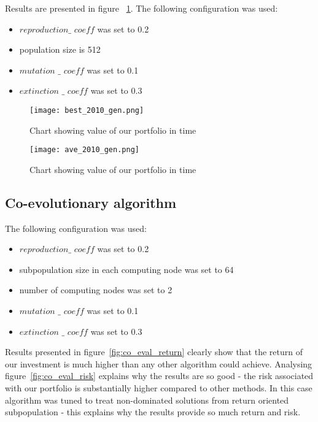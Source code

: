 Results are presented in figure ~\ref{fig:gen-algo}.
The following configuration was used:
\begin{itemize}
  \item $reproduction\_$ $coeff$ was set to 0.2
  \item population size is 512
  \item $mutation$ $\_$ $coeff$ was set to 0.1
  \item $extinction$ $\_$ $coeff$ was set to 0.3
\end{itemize}


\begin{figure}[ht]
  \begin{center}
    \texttt{[image: best\_2010\_gen.png]}
  \end{center}
  \caption{Chart showing value of our portfolio in time}
  \label{fig:gen-algo}
\end{figure}

\begin{figure}[ht]
  \begin{center}
    \texttt{[image: ave\_2010\_gen.png]}
  \end{center}
  \caption{Chart showing value of our portfolio in time}
  \label{fig:gen-algo-ave-2010}
\end{figure}

\subsection{Co-evolutionary algorithm}
\label{sec:co-evol-2}

The following configuration was used:
\begin{itemize}
  \item $reproduction\_$ $coeff$ was set to 0.2
  \item subpopulation size in each computing node was set to 64
  \item number of computing nodes was set to 2
  \item $mutation$ $\_$ $coeff$ was set to 0.1
  \item $extinction$ $\_$ $coeff$ was set to 0.3
\end{itemize}

Results presented in figure~\ref{fig:co_eval_return} clearly show that the return of our investment is much higher than any other algorithm could achieve.  
Analysing figure~\ref{fig:co_eval_risk} explains why the results are so good - the risk associated with our portfolio is substantially higher compared to other methods.
In this case algorithm was tuned to treat non-dominated solutions from return oriented subpopulation - this explains why the results provide so much return and risk. 

